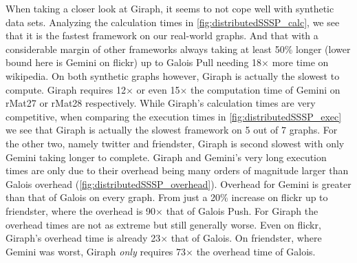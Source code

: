 When taking a closer look at Giraph, it seems to not cope well with synthetic data sets. Analyzing the calculation times in \autoref{fig:distributedSSSP_calc}, we see that it is the fastest framework on our real-world graphs. And that with a considerable margin of other frameworks always taking at least 50\% longer (lower bound here is Gemini on flickr) up to Galois Pull needing 18$\times$ more time on wikipedia.
On both synthetic graphs however, Giraph is actually the slowest to compute. Giraph requires 12$\times$ or even 15$\times$ the computation time of Gemini on rMat27 or rMat28 respectively.
While Giraph's calculation times are very competitive, when comparing the execution times in \autoref{fig:distributedSSSP_exec} we see that Giraph is actually the slowest framework on 5 out of 7 graphs. For the other two, namely twitter and friendster, Giraph is second slowest with only Gemini taking longer to complete.
Giraph and Gemini's very long execution times are only due to their overhead being many orders of magnitude larger than Galois overhead (\autoref{fig:distributedSSSP_overhead}).
Overhead for Gemini is greater than that of Galois on every graph. From just a 20\% increase on flickr up to friendster, where the overhead is 90$\times$ that of Galois Push.
For Giraph the overhead times are not as extreme but still generally worse. Even on flickr, Giraph's overhead time is already 23$\times$ that of Galois. On friendster, where Gemini was worst, Giraph \emph{only} requires 73$\times$ the overhead time of Galois.

